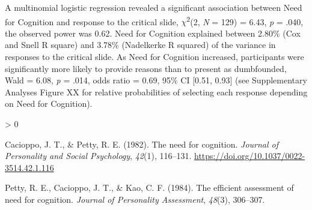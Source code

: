 \documentclass[
  american,
  man,floatsintext]{apa7}
\newlength{\cslhangindent}
\newenvironment{CSLReferences}[2] %
 {%
  \setlength{\parindent}{0pt}
  \ifodd #1 \everypar{\setlength{\hangindent}{\cslhangindent}}\ignorespaces\fi
  \ifnum #2 > 0
  \setlength{\parskip}{#2\baselineskip}
  \fi
 }%
 {}
\begin{document}
A multinomial logistic regression revealed a significant association between Need for Cognition and response to the critical slide, \(\chi\)\textsuperscript{2}(2, \emph{N} = 129) = 6.43, \emph{p} = .040, the observed power was 0.62. Need for Cognition explained between 2.80\% (Cox and Snell R square) and 3.78\% (Nadelkerke R squared) of the variance in responses to the critical slide. As Need for Cognition increased, participants were significantly more likely to provide reasons than to present as dumbfounded, Wald = 6.08, \emph{p} = .014, odds ratio = 0.69, 95\% CI {[}0.51, 0.93{]} (see Supplementary Analyses Figure XX for relative probabilities of selecting each response depending on Need for Cognition).

\hypertarget{refs}{}
\begin{CSLReferences}{1}{0}
\leavevmode\hypertarget{ref-cacioppo_need_1982}{}%
Cacioppo, J. T., \& Petty, R. E. (1982). The need for cognition. \emph{Journal of Personality and Social Psychology}, \emph{42}(1), 116--131. \url{https://doi.org/10.1037/0022-3514.42.1.116}

\leavevmode\hypertarget{ref-petty_efficient_1984}{}%
Petty, R. E., Cacioppo, J. T., \& Kao, C. F. (1984). The efficient assessment of need for cognition. \emph{Journal of Personality Assessment}, \emph{48}(3), 306--307.

\end{CSLReferences}
\end{document}
